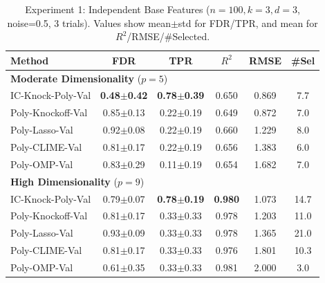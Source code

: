 \begin{table}[htbp]
\centering
\caption{Experiment 1: Independent Base Features ($n=100, k=3, d=3$, noise=0.5, 3 trials). Values show mean$\pm$std for FDR/TPR, and mean for $R^2$/RMSE/\#Selected.}
\label{tab:exp1-results}
\small
\begin{tabular}{lccccc}
\toprule
\textbf{Method} & \textbf{FDR} & \textbf{TPR} & \textbf{$R^2$} & \textbf{RMSE} & \textbf{\#Sel} \\
\midrule
\multicolumn{6}{l}{\textbf{Moderate Dimensionality} ($p=5$)} \\
\midrule
IC-Knock-Poly-Val & \textbf{0.48$\pm$0.42} & \textbf{0.78$\pm$0.39} & 0.650 & 0.869 & 7.7 \\
Poly-Knockoff-Val & 0.85$\pm$0.13 & 0.22$\pm$0.19 & 0.649 & 0.872 & 7.0 \\
Poly-Lasso-Val & 0.92$\pm$0.08 & 0.22$\pm$0.19 & 0.660 & 1.229 & 8.0 \\
Poly-CLIME-Val & 0.81$\pm$0.17 & 0.22$\pm$0.19 & 0.656 & 1.383 & 6.0 \\
Poly-OMP-Val & 0.83$\pm$0.29 & 0.11$\pm$0.19 & 0.654 & 1.682 & 7.0 \\
\midrule
\multicolumn{6}{l}{\textbf{High Dimensionality} ($p=9$)} \\
\midrule
IC-Knock-Poly-Val & 0.79$\pm$0.07 & \textbf{0.78$\pm$0.19} & \textbf{0.980} & 1.073 & 14.7 \\
Poly-Knockoff-Val & 0.81$\pm$0.17 & 0.33$\pm$0.33 & 0.978 & 1.203 & 11.0 \\
Poly-Lasso-Val & 0.93$\pm$0.09 & 0.33$\pm$0.33 & 0.978 & 1.365 & 21.0 \\
Poly-CLIME-Val & 0.81$\pm$0.17 & 0.33$\pm$0.33 & 0.976 & 1.801 & 10.3 \\
Poly-OMP-Val & 0.61$\pm$0.35 & 0.33$\pm$0.33 & 0.981 & 2.000 & 3.0 \\
\bottomrule
\end{tabular}
\end{table}

